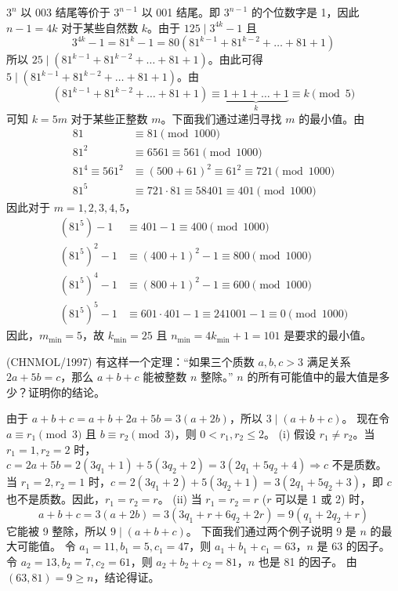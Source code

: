 \begin{questions}
\begin{solution}
$3^n$ 以 003 结尾等价于 $3^{n-1}$ 以 001 结尾。即 $3^{n-1}$ 的个位数字是 1，因此 $n - 1 = 4k$ 对于某些自然数 $k$。由于 $125 \mid 3^{4k} - 1$ 且
\[
3^{4k} - 1 = 81^k - 1 = 80(81^{k-1} + 81^{k-2} + \dots + 81 + 1)
\]
所以 $25 \mid (81^{k-1} + 81^{k-2} + \dots + 81 + 1)$。由此可得 $5 \mid (81^{k-1} + 81^{k-2} + \dots + 81 + 1)$。由
\[
(81^{k-1} + 81^{k-2} + \dots + 81 + 1) \equiv \underbrace{1 + 1 + \dots + 1}_{k} \equiv k \pmod 5
\]
可知 $k = 5m$ 对于某些正整数 $m$。下面我们通过递归寻找 $m$ 的最小值。由
\begin{align*}
81 &\equiv 81 \pmod{1000} \\
81^2 &\equiv 6561 \equiv 561 \pmod{1000} \\
81^4 \equiv 561^2 &\equiv (500 + 61)^2 \equiv 61^2 \equiv 721 \pmod{1000} \\
81^5 &\equiv 721 \cdot 81 \equiv 58401 \equiv 401 \pmod{1000}
\end{align*}
因此对于 $m = 1, 2, 3, 4, 5$，
\begin{align*}
(81^5) - 1 &\equiv 401 - 1 \equiv 400 \pmod{1000} \\
(81^5)^2 - 1 &\equiv (400 + 1)^2 - 1 \equiv 800 \pmod{1000} \\
(81^5)^4 - 1 &\equiv (800 + 1)^2 - 1 \equiv 600 \pmod{1000} \\
(81^5)^5 - 1 &\equiv 601 \cdot 401 - 1 \equiv 241001 - 1 \equiv 0 \pmod{1000}
\end{align*}
因此，$m_{\min} = 5$，故 $k_{\min} = 25$ 且 $n_{\min} = 4k_{\min} + 1 = 101$ 是要求的最小值。
\end{solution}

\question (CHNMOL/1997) 有这样一个定理：“如果三个质数 $a, b, c > 3$ 满足关系 $2a + 5b = c$，那么 $a + b + c$ 能被整数 $n$ 整除。” $n$ 的所有可能值中的最大值是多少？证明你的结论。

\begin{solution}
由于 $a + b + c = a + b + 2a + 5b = 3(a + 2b)$，所以 $3 \mid (a + b + c)$。
现在令 $a \equiv r_1 \pmod 3$ 且 $b \equiv r_2 \pmod 3$，则 $0 < r_1, r_2 \leq 2$。
(i) 假设 $r_1 \neq r_2$。当 $r_1 = 1, r_2 = 2$ 时，
$c = 2a + 5b = 2(3q_1 + 1) + 5(3q_2 + 2) = 3(2q_1 + 5q_2 + 4) \Rightarrow c$ 不是质数。
当 $r_1 = 2, r_2 = 1$ 时，$c = 2(3q_1 + 2) + 5(3q_2 + 1) = 3(2q_1 + 5q_2 + 3)$，即 $c$ 也不是质数。因此，$r_1 = r_2 = r$。
(ii) 当 $r_1 = r_2 = r$ ($r$ 可以是 1 或 2) 时，
\[
a + b + c = 3(a + 2b) = 3(3q_1 + r + 6q_2 + 2r) = 9(q_1 + 2q_2 + r)
\]
它能被 9 整除，所以 $9 \mid (a + b + c)$。
下面我们通过两个例子说明 9 是 $n$ 的最大可能值。
令 $a_1 = 11, b_1 = 5, c_1 = 47$，则 $a_1 + b_1 + c_1 = 63$，$n$ 是 63 的因子。
令 $a_2 = 13, b_2 = 7, c_2 = 61$，则 $a_2 + b_2 + c_2 = 81$，$n$ 也是 81 的因子。
由 $(63, 81) = 9 \geq n$，结论得证。
\end{solution}


\end{questions}
